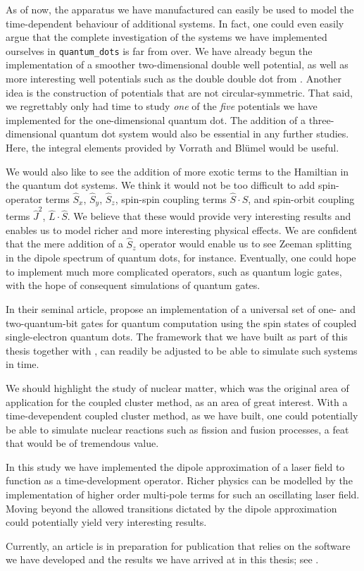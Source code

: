 As of now, the apparatus we have manufactured can easily be used to model 
the time-dependent behaviour of additional systems. In fact, one could even 
easily argue that the complete investigation of the systems we have implemented 
ourselves in \lstinline{quantum_dots} is far from over. We have already begun
the implementation of a smoother two-dimensional double well potential, as well as 
more interesting well potentials such as the double double dot 
from \citeauthor{nielsen2012configuration} \cite{nielsen2012configuration}. Another 
idea is the construction of potentials that are not circular-symmetric.
That said, we regrettably only had time to study \emph{one} of the
\emph{five} potentials we have implemented for the one-dimensional quantum dot.
The addition of a three-dimensional quantum dot system would also be essential 
in any further studies. Here, the integral elements provided by
Vorrath and Blümel \cite{vorrath2003electronic} would be useful.

We would also like to see the addition of more exotic terms to the Hamiltian in the 
quantum dot systems. We think it would not be too difficult to add spin-operator 
terms $\hat{S}_x$, $\hat{S}_y$, $\hat{S}_z$, spin-spin coupling terms
$\hat{S}\cdot\hat{S}$, and spin-orbit
coupling terms $\hat{J}^2$, $\hat{L}\cdot\hat{S}$. We believe that these would provide 
very interesting results and enables us to model richer and more interesting physical
effects. We are 
confident that the 
mere addition of a $\hat{S}_z$ operator would enable us to see Zeeman splitting in 
the dipole spectrum of quantum dots, for instance. Eventually, one could hope to 
implement much more complicated operators, such as quantum logic gates, with the 
hope of consequent simulations of quantum gates.

In their seminal article, \citeauthor{loss1998quantum} \cite{loss1998quantum} propose 
an implementation of a universal set of one- and two-quantum-bit gates for quantum
computation using the spin states of coupled single-electron quantum dots. The framework 
that we have built as part of this thesis together with \citeauthor{islandwind2019}, 
can readily be adjusted to be able to simulate such systems in time.

We should highlight the study of nuclear matter, which was the original area 
of application for the coupled cluster method, as an area of great interest. With 
a time-devependent coupled cluster method, as we have built, one could potentially be able
to simulate  
nuclear reactions such as fission and fusion processes, a feat that would be of 
tremendous value.

In this study we have implemented the dipole approximation of a laser field to function 
as a time-development operator. 
Richer physics can be modelled by the implementation of higher order 
multi-pole terms for such an oscillating laser field. Moving beyond the allowed transitions
dictated by the dipole approximation could potentially yield very interesting results.

Currently, an article is in preparation for publication that relies on the 
software we have developed and the results we have arrived at in this thesis;
see \citeauthor{kristiansen2019time} \cite{kristiansen2019time}.

\clearemptydoublepage

